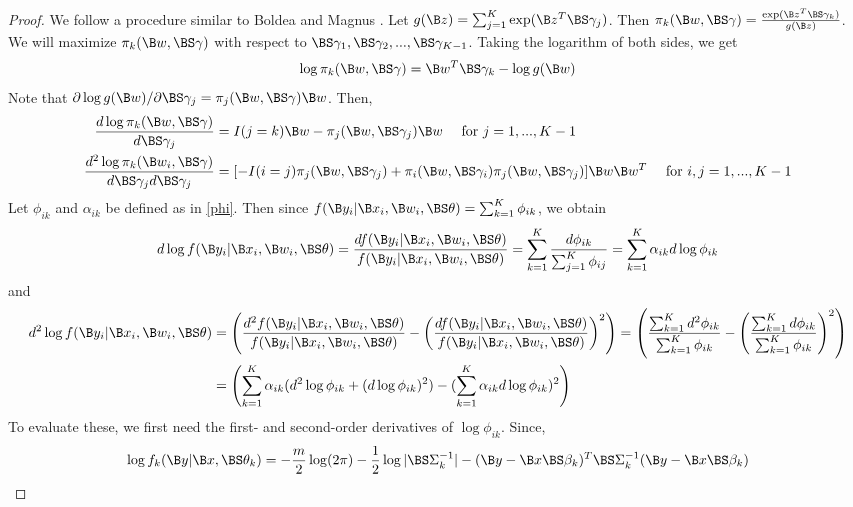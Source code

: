\begin{proof}
We follow a procedure similar to Boldea and Magnus \cite{boldea2009}. Let $g(\B  z)=\sum_{j=1}^{K}\exp(\B  z^{T}\BS \gamma_{j})$. Then $\pi_{k}(\B w,\BS\gamma)=\frac{\exp( \B  z^{T}\BS\gamma_{k})}{g(\B  z)}$. We will maximize $\pi_{k}(\B w,\BS\gamma)$ with respect to $\BS\gamma_{1},\BS\gamma_{2},...,\BS\gamma_{K-1}$. Taking the logarithm of both sides, we get
\begin{align}
\log \pi_{k}(\B w,\BS\gamma)=\B w^{T}\BS\gamma_{k} - \log g(\B w)
\label{wts}
\end{align}
Note that $\partial\log g(\B w)/\partial \BS \gamma_{j}=\pi_{j}(\B w,\BS\gamma) \B w$. Then,
\begin{align}
\frac{d\log\pi_{k}(\B w,\BS\gamma)}{d\BS\gamma_{j}}&=I(j=k)\B w-\pi_{j}(\B w,\BS\gamma_{j})\B w\quad\text{ for }j=1,...,K-1\nonumber\\
\frac{d^{2}\log\pi_{k}(\B w_{i},\BS\gamma)}{d\BS\gamma_{j}d\BS\gamma_{j}}&=[-I(i=j)\pi_{j}(\B w,\BS\gamma_{j})+\pi_{i}(\B w,\BS\gamma_{i})\pi_{j}(\B w,\BS\gamma_{j})]\B w\B w^{T}\quad\text{ for }i,j=1,...,K-1
\label{logpi}
\end{align}
Let $\phi_{ik}$ and $\alpha_{ik}$ be defined as in \eqref{phi}. Then since $f(\B y_{i}|\B x_{i},\B w_{i},\BS\theta)=\sum^{K}_{k=1}\phi_{ik}$, we obtain
\begin{align}
d\log f(\B y_{i}|\B x_{i},\B w_{i},\BS\theta)=\frac{d f(\B y_{i}|\B x_{i},\B w_{i},\BS\theta)}{f(\B y_{i}|\B x_{i},\B w_{i},\BS\theta)}=\sum^{K}_{k=1}\frac{d\phi_{ik}}{\sum^{K}_{j=1}\phi_{ij}}=\sum^{K}_{k=1}\alpha_{ik}d\log \phi_{ik}\label{dlogf}
\end{align}
and 
\begin{align}\label{d2logf}
d^{2}\log f(\B y_{i}|\B x_{i},\B w_{i},\BS\theta)&=\left(\frac{d^{2} f(\B y_{i}|\B x_{i},\B w_{i},\BS\theta)}{f(\B y_{i}|\B x_{i},\B w_{i},\BS\theta)}-\left(\frac{d f(\B y_{i}|\B x_{i},\B w_{i},\BS\theta)}{f(\B y_{i}|\B x_{i},\B w_{i},\BS\theta)}\right)^{2}\right)=\left(\frac{\sum^{K}_{k=1}d^{2}\phi_{ik}}{\sum^{K}_{k=1}\phi_{ik}}-\left(\frac{\sum^{K}_{k=1}d \phi_{ik}}{\sum^{K}_{k=1}\phi_{ik}}\right)^{2}\right)\nonumber\\
&=\left(\sum^{K}_{k=1}\alpha_{ik}(d^{2}\log \phi_{ik}+(d\log \phi_{ik})^{2})-(\sum^{K}_{k=1}\alpha_{ik}d\log \phi_{ik})^{2}\right)
\end{align}
To evaluate these, we first need the first- and second-order derivatives of $\log \phi_{ik}$.  Since, 
\begin{align*}
\log f_{k}(\B y|\B x,\BS\theta_{k})=-\frac{m}{2}\log(2\pi)-\frac{1}{2}\log |\BS\Sigma_{k}^{-1}|-(\B y-\B x\BS \beta_{k})^{T}\BS\Sigma_{k}^{-1}(\B y-\B x\BS\beta_{k})

\end{align*}
\end{proof}
